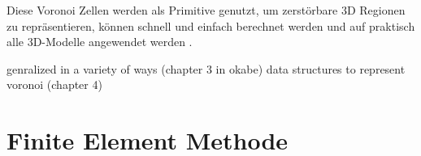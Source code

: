Diese Voronoi Zellen werden als Primitive genutzt, um zerstörbare 3D Regionen zu repräsentieren, können schnell und einfach berechnet werden und auf praktisch alle 3D-Modelle
angewendet werden \cite{Najim.DynamicFracturing}.

genralized in a variety of ways (chapter 3 in okabe)
data structures to represent voronoi (chapter 4)



\section{Finite Element Methode}
